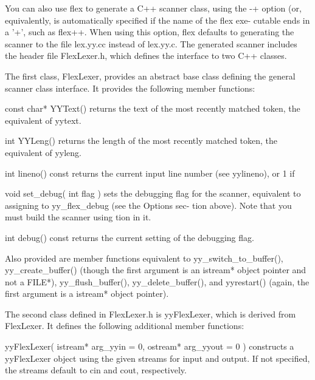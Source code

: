 \documentclass[12pt,spanish,twocolumn,lettersize]{article}
\begin{document}
{       You  can	 also  use  flex to generate a C++ scanner class,
       using the -+ option (or, equivalently, %
       is  automatically  specified  if the name of the flex exe-
       cutable ends in a '+', such as flex++.	When  using  this
       option,	flex  defaults	to  generating the scanner to the
       file lex.yy.cc instead of lex.yy.c.  The generated scanner
       includes	 the  header  file FlexLexer.h, which defines the
       interface to two C++ classes.

       The first class,	 FlexLexer,  provides  an  abstract  base
       class  defining	the  general scanner class interface.  It
       provides the following member functions:

       const char* YYText()
	      returns the  text	 of  the  most	recently  matched
	      token, the equivalent of yytext.

       int YYLeng()
	      returns  the  length  of	the most recently matched
	      token, the equivalent of yyleng.

       int lineno() const
	      returns the current input line number (see  %
	      yylineno), or 1 if %

       void set_debug( int flag )
	      sets the debugging flag for the scanner, equivalent
	      to assigning to yy_flex_debug (see the Options sec-
	      tion  above).  Note that you must build the scanner
	      using %
	      tion in it.

       int debug() const
	      returns  the current setting of the debugging flag.

       Also  provided  are   member   functions	  equivalent   to
       yy_switch_to_buffer(),	yy_create_buffer()   (though  the
       first argument is an istream* object  pointer  and  not	a
       FILE*),	  yy_flush_buffer(),	yy_delete_buffer(),   and
       yyrestart() (again,  the	 first	argument  is  a	 istream*
       object pointer).

       The  second  class  defined in FlexLexer.h is yyFlexLexer,
       which is derived from FlexLexer.	 It defines the following
       additional member functions:

       yyFlexLexer( istream* arg_yyin = 0, ostream* arg_yyout = 0
	      )
	      constructs a yyFlexLexer	object	using  the  given
	      streams  for  input  and output.	If not specified,
	      the streams default to cin and cout,  respectively.

}
\end{document}
